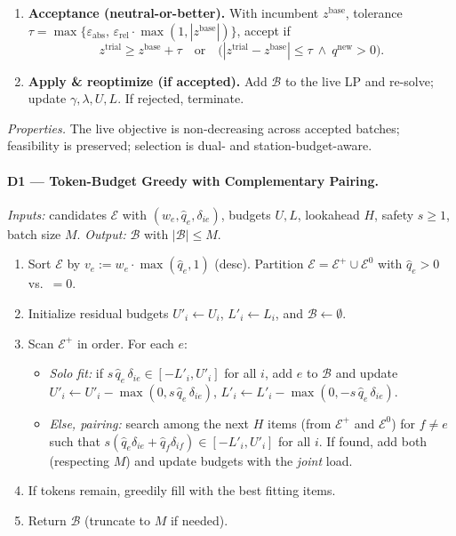 \documentclass[11pt,a4paper]{article}
\begin{document}
\begin{enumerate}
\begin{enumerate}
  \emph{only} to the new $q$-coefficients. Solve; record $z^{\mathrm{trial}}$ and 
  $q^{\mathrm{new}}:=\sum_{(o,d,a)\in\mathcal{B}} q_{od}(a)$.
  \item \textbf{Acceptance (neutral-or-better).} With incumbent $z^{\mathrm{base}}$, tolerance
  $\tau=\max\{\varepsilon_{\mathrm{abs}},\,\varepsilon_{\mathrm{rel}}\cdot\max(1,|z^{\mathrm{base}}|)\}$,
  accept if
  \[
  z^{\mathrm{trial}} \ge z^{\mathrm{base}}+\tau
  \quad\text{or}\quad
  \bigl(|z^{\mathrm{trial}}-z^{\mathrm{base}}|\le \tau\ \wedge\ q^{\mathrm{new}}>0\bigr).
  \]
  \item \textbf{Apply \& reoptimize (if accepted).} Add $\mathcal{B}$ to the live LP and re-solve; update $\gamma,\lambda,U,L$.
  If rejected, terminate.
  \end{enumerate}
\end{enumerate}

\noindent\emph{Properties.} The live objective is non-decreasing across accepted batches;
feasibility is preserved; selection is dual- and station-budget-aware.

\paragraph{D1 — Token-Budget Greedy with Complementary Pairing.}
\emph{Inputs:} candidates $\mathcal{E}$ with $(w_e,\widehat q_e,\delta_{ie})$, budgets $U,L$, lookahead $H$, safety $s\ge 1$, batch size $M$.
\emph{Output:} $\mathcal{B}$ with $|\mathcal{B}|\le M$.
\begin{enumerate}
\item Sort $\mathcal{E}$ by $v_e:=w_e\cdot \max(\widehat q_e,1)$ (desc).
Partition $\mathcal{E}=\mathcal{E}^+\cup\mathcal{E}^0$ with $\widehat q_e>0$ vs.\ $=0$.
\item Initialize residual budgets $U'_i\gets U_i$, $L'_i\gets L_i$, and $\mathcal{B}\gets\emptyset$.
\item Scan $\mathcal{E}^+$ in order. For each $e$:
\begin{itemize}
\item \emph{Solo fit:} if $s\,\widehat q_e\,\delta_{ie}\in[-L'_i,U'_i]$ for all $i$, add $e$ to $\mathcal{B}$ and update
$U'_i\leftarrow U'_i-\max(0,s\,\widehat q_e\,\delta_{ie})$, $L'_i\leftarrow L'_i-\max(0,-s\,\widehat q_e\,\delta_{ie})$.
\item \emph{Else, pairing:} search among the next $H$ items (from $\mathcal{E}^+$ and $\mathcal{E}^0$) for $f\ne e$
such that $s(\widehat q_e\delta_{ie}+\widehat q_f\delta_{if})\in[-L'_i,U'_i]$ for all $i$.
If found, add both (respecting $M$) and update budgets with the \emph{joint} load.
\end{itemize}
\item If tokens remain, greedily fill with the best fitting items.
\item Return $\mathcal{B}$ (truncate to $M$ if needed).
\end{enumerate}
\end{document}
